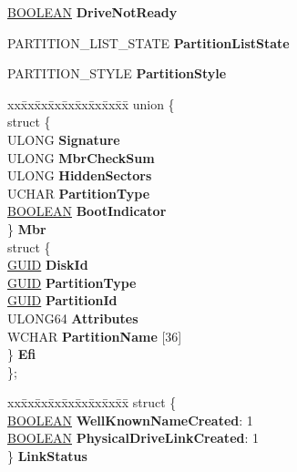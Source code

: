 \begin{DoxyCompactItemize}
\item 
\mbox{\label{struct___d_i_s_k___d_a_t_a_aa4d1d980e2ec25fcc657e2f396d0b0fe}} 
\hyperlink{_processor_bind_8h_a112e3146cb38b6ee95e64d85842e380a}{B\+O\+O\+L\+E\+AN} {\bfseries Drive\+Not\+Ready}
\item 
\mbox{\label{struct___d_i_s_k___d_a_t_a_abb43050489610c873b5b3c67420f86ef}} 
P\+A\+R\+T\+I\+T\+I\+O\+N\+\_\+\+L\+I\+S\+T\+\_\+\+S\+T\+A\+TE {\bfseries Partition\+List\+State}
\item 
\mbox{\label{struct___d_i_s_k___d_a_t_a_a67f3d18f376a85456a8f5bfb72e6c4a5}} 
P\+A\+R\+T\+I\+T\+I\+O\+N\+\_\+\+S\+T\+Y\+LE {\bfseries Partition\+Style}
\item 
\mbox{\label{struct___d_i_s_k___d_a_t_a_a3267c1090dec1496eb99d4d6bbcf6d2a}} 
\begin{tabbing}
xx\=xx\=xx\=xx\=xx\=xx\=xx\=xx\=xx\=\kill
union \{\\
\>struct \{\\
\>\>ULONG {\bfseries Signature}\\
\>\>ULONG {\bfseries MbrCheckSum}\\
\>\>ULONG {\bfseries HiddenSectors}\\
\>\>UCHAR {\bfseries PartitionType}\\
\>\>\hyperlink{_processor_bind_8h_a112e3146cb38b6ee95e64d85842e380a}{BOOLEAN} {\bfseries BootIndicator}\\
\>\} {\bfseries Mbr}\\
\>struct \{\\
\>\>\hyperlink{interface_g_u_i_d}{GUID} {\bfseries DiskId}\\
\>\>\hyperlink{interface_g_u_i_d}{GUID} {\bfseries PartitionType}\\
\>\>\hyperlink{interface_g_u_i_d}{GUID} {\bfseries PartitionId}\\
\>\>ULONG64 {\bfseries Attributes}\\
\>\>WCHAR {\bfseries PartitionName} \mbox{[}36\mbox{]}\\
\>\} {\bfseries Efi}\\
\}; \\

\end{tabbing}\item 
\mbox{\label{struct___d_i_s_k___d_a_t_a_af932bfaba064e18e728c69626d4d55db}} 
\begin{tabbing}
xx\=xx\=xx\=xx\=xx\=xx\=xx\=xx\=xx\=\kill
struct \{\\
\>\hyperlink{_processor_bind_8h_a112e3146cb38b6ee95e64d85842e380a}{BOOLEAN} {\bfseries WellKnownNameCreated}: 1\\
\>\hyperlink{_processor_bind_8h_a112e3146cb38b6ee95e64d85842e380a}{BOOLEAN} {\bfseries PhysicalDriveLinkCreated}: 1\\
\} {\bfseries LinkStatus}\\


\end{tabbing}
\end{DoxyCompactItemize}
